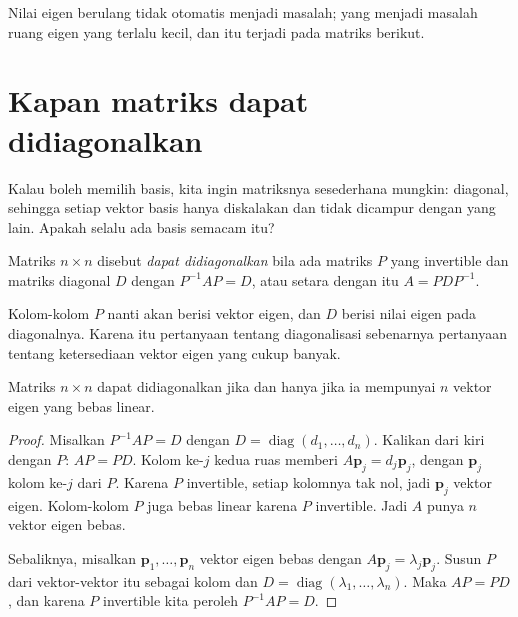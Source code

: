 Nilai eigen berulang tidak otomatis menjadi masalah; yang menjadi masalah ruang eigen yang terlalu
kecil, dan itu terjadi pada matriks berikut.

\section{Kapan matriks dapat didiagonalkan}

Kalau boleh memilih basis, kita ingin matriksnya sesederhana mungkin: diagonal, sehingga setiap
vektor basis hanya diskalakan dan tidak dicampur dengan yang lain. Apakah selalu ada basis semacam
itu?

\begin{definisi}
Matriks $n\times n$ disebut \emph{dapat didiagonalkan} bila ada matriks $P$ yang invertible dan
matriks diagonal $D$ dengan $P^{-1}AP=D$, atau setara dengan itu $A=PDP^{-1}$.
\end{definisi}


Kolom-kolom $P$ nanti akan berisi vektor eigen, dan $D$ berisi nilai eigen pada diagonalnya.
Karena itu pertanyaan tentang diagonalisasi sebenarnya pertanyaan tentang ketersediaan vektor
eigen yang cukup banyak.

\begin{teorema}
Matriks $n\times n$ dapat didiagonalkan jika dan hanya jika ia mempunyai $n$ vektor eigen yang
bebas linear.
\end{teorema}

\begin{proof}
Misalkan $P^{-1}AP=D$ dengan $D=\operatorname{diag}(d_{1},\dots,d_{n})$. Kalikan dari kiri
dengan $P$: $AP=PD$. Kolom ke-$j$ kedua ruas memberi
$A\mathbf{p}_{j}=d_{j}\mathbf{p}_{j}$, dengan $\mathbf{p}_{j}$ kolom ke-$j$ dari $P$. Karena $P$
invertible, setiap kolomnya tak nol, jadi $\mathbf{p}_{j}$ vektor eigen. Kolom-kolom $P$ juga
bebas linear karena $P$ invertible. Jadi $A$ punya $n$ vektor eigen bebas.

Sebaliknya, misalkan $\mathbf{p}_{1},\dots,\mathbf{p}_{n}$ vektor eigen bebas dengan
$A\mathbf{p}_{j}=\lambda_{j}\mathbf{p}_{j}$. Susun $P$ dari vektor-vektor itu sebagai kolom dan
$D=\operatorname{diag}(\lambda_{1},\dots,\lambda_{n})$. Maka $AP=PD$, dan karena $P$ invertible
kita peroleh $P^{-1}AP=D$.
\end{proof}

